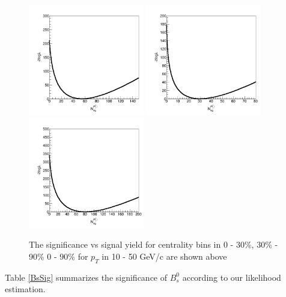 \begin{figure}[h]
\begin{center}
\includegraphics[width= 0.45\textwidth]{Figures/Chapter4/sigscan_0_30_10_50.png}
\includegraphics[width= 0.45\textwidth]{Figures/Chapter4/sigscan_30_90_10_50.png}
\includegraphics[width= 0.45\textwidth]{Figures/Chapter4/sigscan_0_90_10_50.png}
\caption{The significance vs signal yield for centrality bins in 0 - 30\%, 30\% - 90\% 0 - 90\% for $p_T$ in 10 - 50 GeV/c are shown above}
\label{fig:SigScanCent}
\end{center}
\end{figure}



Table \ref{BsSig} summarizes the significance of $B^0_s$ according to our likelihood estimation.



